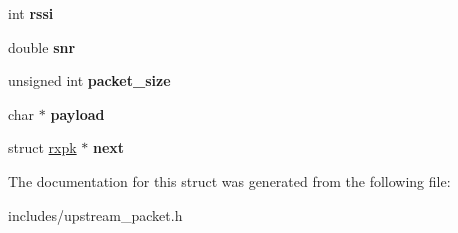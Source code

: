 \begin{DoxyCompactItemize}
\item 
\hypertarget{structrxpk_ab6f4522a5a5c4577c16d0e23339a1414}{int {\bfseries rssi}}\label{structrxpk_ab6f4522a5a5c4577c16d0e23339a1414}

\item 
\hypertarget{structrxpk_a31a715ebcd5579924b4d67ca9009e7e6}{double {\bfseries snr}}\label{structrxpk_a31a715ebcd5579924b4d67ca9009e7e6}

\item 
\hypertarget{structrxpk_aee1a30bf4a12e49db87ac9751f93549b}{unsigned int {\bfseries packet\-\_\-size}}\label{structrxpk_aee1a30bf4a12e49db87ac9751f93549b}

\item 
\hypertarget{structrxpk_a18f141cb2726073503afb9f1d6c85efb}{char $\ast$ {\bfseries payload}}\label{structrxpk_a18f141cb2726073503afb9f1d6c85efb}

\item 
\hypertarget{structrxpk_a5455ebea0dde09f27d432e404a4d9f71}{struct \hyperlink{structrxpk}{rxpk} $\ast$ {\bfseries next}}\label{structrxpk_a5455ebea0dde09f27d432e404a4d9f71}

\end{DoxyCompactItemize}


The documentation for this struct was generated from the following file\-:\begin{DoxyCompactItemize}
\item 
includes/upstream\-\_\-packet.\-h\end{DoxyCompactItemize}
